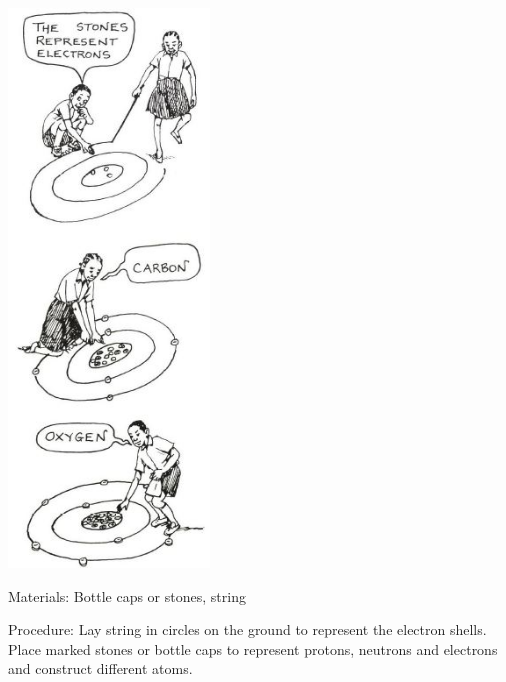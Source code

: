 \begin{multicols}{2}
\begin{center}
\includegraphics[width=0.4\textwidth]{./img/source/stone-atoms.jpg}
\end{center}

\begin{description*}
\item[Materials:]{Bottle caps or stones, string}
\item[Procedure:]{Lay string in circles on the ground to represent the electron shells. Place marked stones or bottle caps to represent protons, neutrons and electrons and construct different atoms.}
\end{description*}

\vfill
\columnbreak



\end{multicols}
